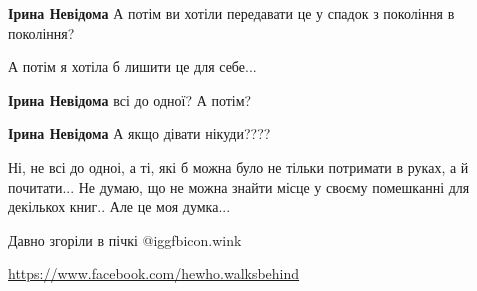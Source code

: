 \begin{itemize}
 
\textbf{Ірина Невідома} А потім ви хотіли передавати це у спадок з покоління в покоління?

 
А потім я хотіла б лишити це для себе...

 
\textbf{Ірина Невідома} всі до одної? А потім?

 
\textbf{Ірина Невідома} А якщо дівати нікуди????

 

Ні, не всі до одноі, а ті, які б можна було не тільки потримати в руках, а й
почитати... Не думаю, що не можна знайти місце у своєму помешканні для декількох
книг.. Але це моя думка...

 
Давно згоріли в пічкі @igg{fbicon.wink} 

\url{https://www.facebook.com/hewho.walksbehind}\par
 

\end{itemize}
